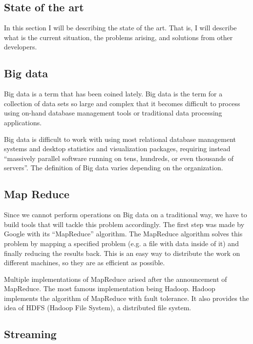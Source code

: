 \subsection{State of the art}

In this section I will be describing the state of the art. That is, I will
describe what is the current situation, the problems arising, and solutions
from other developers.

\subsection{Big data}

Big data\cite{wikibigdata} is a term that has been coined lately. Big data is
the term for a collection of data sets so large and complex that it becomes
difficult to process using on-hand database management tools or traditional
data processing applications.

Big data is difficult to work with using most relational database management
systems and desktop statistics and visualization packages, requiring instead
``massively parallel software running on tens, hundreds, or even thousands of
servers''. The definition of Big data varies depending on the organization.

\subsection{Map Reduce}

Since we cannot perform operations on Big data on a traditional way, we have to
build tools that will tackle this problem accordingly. The first step was made
by Google with its ``MapReduce'' algorithm\cite{mapreduce}. The MapReduce
algorithm solves this problem by mapping a specified problem (e.g. a file with
data inside of it) and finally reducing the results back. This is an easy way
to distribute the work on different machines, so they are as efficient as
possible.

Multiple implementations of MapReduce arised after the announcement of
MapReduce. The most famous implementation being Hadoop\cite{hadoop}. Hadoop
implements the algorithm of MapReduce with fault tolerance. It also provides
the idea of HDFS (Hadoop File System), a distributed file system.

\subsection{Streaming}

